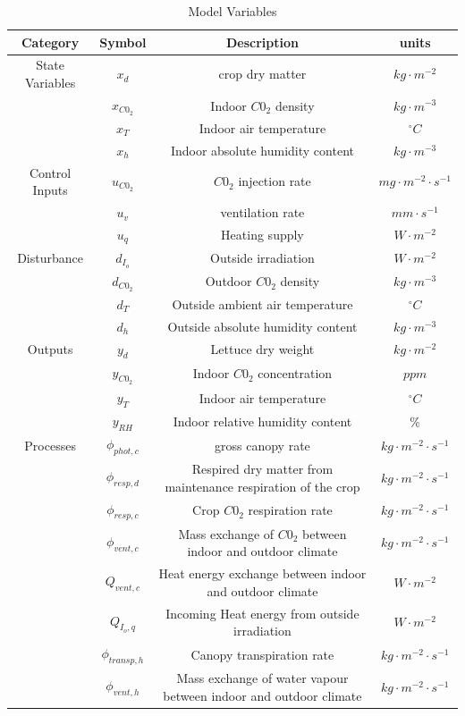 \begin{table}[H]
	\begin{center}
		\begin{tabular}{|c|c|c|c|}
			\hline
			Category & Symbol & Description & units 
			\\ \hline
			State Variables & $x_d$& crop dry matter& $kg \cdot m^{-2}$
			\\
			& $x_{C0_2}$& Indoor $C0_2$ density& $kg \cdot m^{-3}$
			\\
			& $x_{T}$& Indoor air temperature& $^{\circ}C$
			\\
			& $x_{h}$& Indoor absolute humidity content& $kg \cdot m^{-3}$
			\\ \hline
			Control Inputs & $u_{C0_2}$& $C0_2$ injection rate& $mg \cdot m^{-2} \cdot s^{-1}$
			\\
			& $u_{v}$& ventilation rate& $mm \cdot s^{-1}$
			\\
			& $u_{q}$& Heating supply& $ W \cdot m^{-2}$
			\\ \hline
			Disturbance     & $d_{I_o}$& Outside irradiation & $ W \cdot m^{-2}$
			\\
			& $d_{C0_2}$& Outdoor $C0_2$ density& $kg \cdot m^{-3}$
			\\
			& $d_{T}$& Outside ambient air temperature& $^{\circ}C$
			\\
			& $d_{h}$& Outside absolute humidity content& $kg \cdot m^{-3}$
			\\ \hline
			Outputs        & $y_d$& Lettuce dry weight& $kg \cdot m^{-2}$
			\\
			& $y_{C0_2}$& Indoor $C0_2$ concentration& $ppm$
			\\
			& $y_{T}$& Indoor air temperature& $^{\circ}C$
			\\
			& $y_{RH}$& Indoor relative humidity content& $\%$
			\\ \hline
			Processes       & $\phi_{phot,c}$& gross canopy rate& $kg \cdot m^{-2} \cdot s^{-1}$
			\\
			& $\phi_{resp,d}$&Respired dry matter from maintenance respiration of the crop& $kg \cdot m^{-2} \cdot s^{-1}$
			\\
			& $\phi_{resp,c}$& Crop $C0_2$ respiration rate & $kg \cdot m^{-2} \cdot s^{-1}$
			\\
			& $\phi_{vent,c}$& Mass exchange of $C0_2$ between indoor and outdoor climate & $kg \cdot m^{-2} \cdot s^{-1}$
			\\
			& $Q_{vent,c}$& Heat energy exchange  between indoor and outdoor climate & $W \cdot m^{-2}$
			\\
			& $Q_{I_o,q}$& Incoming Heat energy from outside irradiation & $W \cdot m^{-2}$
			\\
			& $\phi_{transp,h}$& Canopy transpiration rate & $kg \cdot m^{-2} \cdot s^{-1}$
			\\
			& $\phi_{vent,h}$& Mass exchange of water vapour between indoor and outdoor climate & $kg \cdot m^{-2} \cdot s^{-1}$
			\\ \hline
			
			
		\end{tabular}
	\end{center}
	\caption{Model Variables}
	\label{tab:model variables and descriptions}
\end{table}

